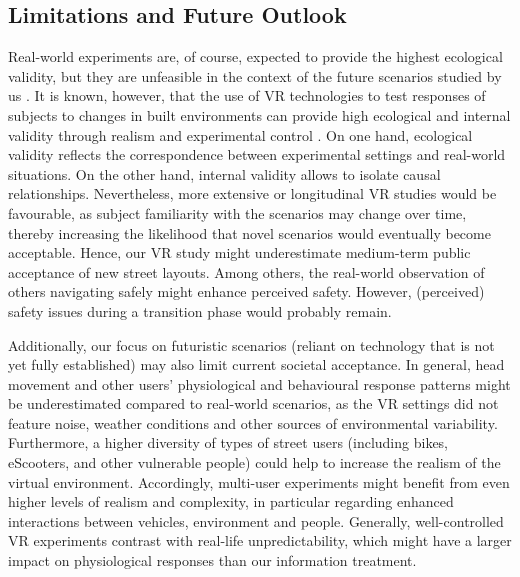 \subsection{Limitations and Future Outlook} \label{subsec:limitations}

Real-world experiments are, of course, expected to provide the highest ecological validity, but they are unfeasible in the context of the future scenarios studied by us \cite{Dubey2021}. It is known, however, that the use of VR technologies to test responses of subjects to changes in built environments can provide high ecological and internal validity \cite{Loomis1999} through realism \cite{Angulo2023} and experimental control \cite{Guo2022}. On one hand, ecological validity reflects the correspondence between experimental settings and real-world situations. On the other hand, internal validity allows to isolate causal relationships. Nevertheless, more extensive or longitudinal VR studies would be favourable, as subject familiarity with the scenarios may change over time, thereby increasing the likelihood that novel scenarios would eventually become acceptable. Hence, our VR study might underestimate medium-term public acceptance of new street layouts. Among others, the real-world observation of others navigating safely might enhance perceived safety. However, (perceived) safety issues during a transition phase would probably remain. 

Additionally, our focus on futuristic scenarios (reliant on technology that is not yet fully established) may also limit current societal acceptance. In general, head movement and other users' physiological and behavioural response patterns might be underestimated compared to real-world scenarios, as the VR settings did not feature noise, weather conditions and other sources of environmental variability. Furthermore, a higher diversity of types of street users (including bikes, eScooters, and other vulnerable people) could help to increase the realism of the virtual environment. Accordingly, multi-user experiments might benefit from even higher levels of realism and complexity, in particular regarding enhanced interactions between vehicles, environment and people. Generally, well-controlled VR experiments contrast with real-life unpredictability, which might have a larger impact on physiological responses than our information treatment. 

